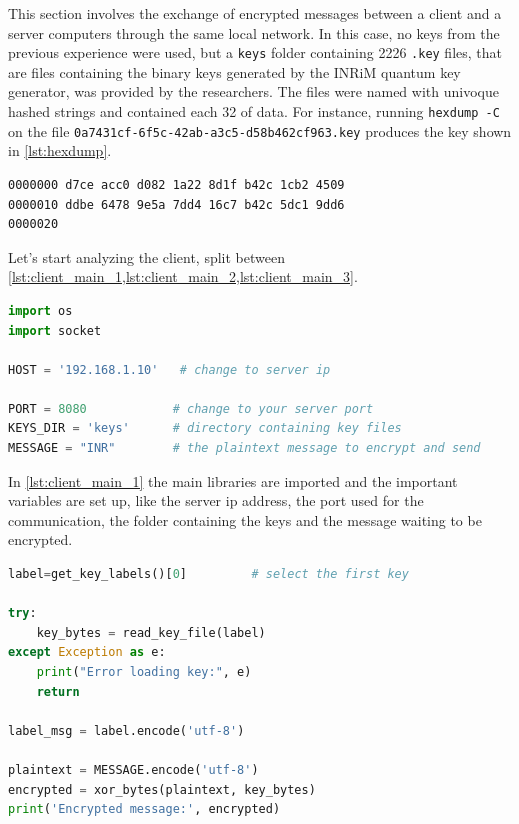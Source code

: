 This section involves the exchange of encrypted messages between a
client and a server computers through the same local network. In this
case, no keys from the previous
experience were used, but
a \texttt{keys} folder containing 2226 \texttt{.key} files, that are
files containing the
binary keys generated by the INRiM quantum key generator, was provided by
the researchers. The files were named with univoque hashed strings
and contained each \SI{32}{\byte} of data. For instance, running
\texttt{hexdump -C} on the file
\texttt{0a7431cf-6f5c-42ab-a3c5-d58b462cf963.key} produces the key
shown in \cref{lst:hexdump}.

\begin{lstlisting}[basicstyle=\ttfamily\footnotesize,language=bash, caption=Output of \texttt{hexdump} command on a given key file., label=lst:hexdump, float=h]
0000000 d7ce acc0 d082 1a22 8d1f b42c 1cb2 4509
0000010 ddbe 6478 9e5a 7dd4 16c7 b42c 5dc1 9dd6
0000020
\end{lstlisting}

Let's start analyzing the client, split between
\cref{lst:client_main_1,lst:client_main_2,lst:client_main_3}.

\begin{lstlisting}[basicstyle=\ttfamily\footnotesize, language=python, caption=Client script (part 1)., label=lst:client_main_1, float=h]
import os
import socket

HOST = '192.168.1.10'   # change to server ip

PORT = 8080            # change to your server port
KEYS_DIR = 'keys'      # directory containing key files
MESSAGE = "INR"        # the plaintext message to encrypt and send
\end{lstlisting}
In \cref{lst:client_main_1} the main libraries are imported and the important
variables are set up, like the
server ip address, the port used for the communication, the folder
containing the keys and the
message waiting to be encrypted.

\begin{lstlisting}[basicstyle=\ttfamily\footnotesize, language=python, caption= Client script (part 2)., label=lst:client_main_2, float=h]
label=get_key_labels()[0]         # select the first key

try:
    key_bytes = read_key_file(label)
except Exception as e:
    print("Error loading key:", e)
    return

label_msg = label.encode('utf-8')

plaintext = MESSAGE.encode('utf-8')
encrypted = xor_bytes(plaintext, key_bytes)
print('Encrypted message:', encrypted)
\end{lstlisting}

